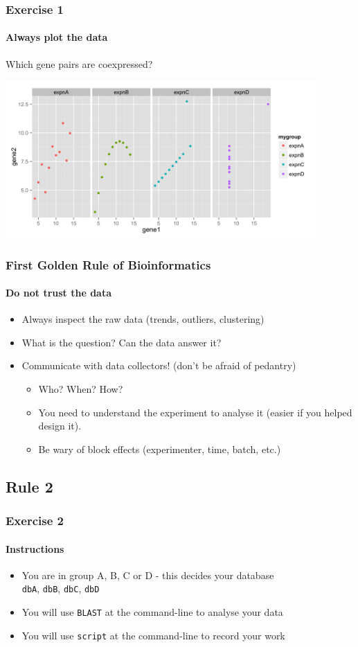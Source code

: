 \documentclass[table]{beamer}
\begin{document}
  \begin{frame}
    \frametitle{Exercise 1}
    \framesubtitle{Always plot the data}
    Which gene pairs are coexpressed?
    \begin{center}
      \includegraphics[width=0.9\textwidth]{images/ex1_rplot} \\
    \end{center}
  \end{frame}

  \begin{frame}
    \frametitle{First Golden Rule of Bioinformatics}
    \framesubtitle{Do not trust the data}
	\begin{itemize}
	  \item Always inspect the raw data (trends, outliers, clustering)
	  \item What is the question? Can the data answer it?
	  \item Communicate with data collectors! (don't be afraid of pedantry)
	  \begin{itemize}
	    \item Who? When? How?
	    \item You need to understand the experiment to analyse it (easier if you helped design it).
	    \item Be wary of block effects (experimenter, time, batch, etc.)
	  \end{itemize}
	\end{itemize}
  \end{frame}

  \subsection{Rule 2}
  \begin{frame}
    \frametitle{Exercise 2}
    \framesubtitle{Instructions}    
    \begin{itemize}
      \item You are in group A, B, C or D - this decides your database\\
      \texttt{dbA}, \texttt{dbB}, \texttt{dbC}, \texttt{dbD}
      \item You will use \texttt{BLAST} at the command-line to analyse your data
      \item You will use \texttt{script} at the command-line to record your work
    \end{itemize}
  \end{frame}
\end{document}
